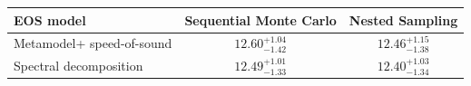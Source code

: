 \renewcommand{\arraystretch}{1.4}
\begin{tabular}{p{4.5cm}cc}
    \hline
    EOS model & Sequential Monte Carlo & Nested Sampling \\
    \hline
    Metamodel\newline + speed-of-sound & $12.60^{+1.04}_{-1.42}$ & $12.46^{+1.15}_{-1.38}$ \\
    Spectral decomposition & $12.49^{+1.01}_{-1.33}$ & $12.40^{+1.03}_{-1.34}$ \\
    \hline
\end{tabular}
